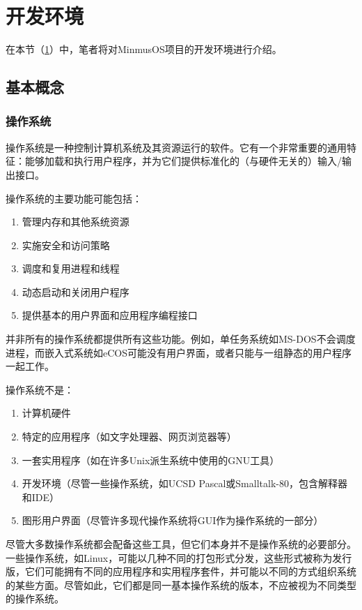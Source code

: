 \section{开发环境}\label{sec:DevelopmentEnvironment}

在本节（\cref{sec:DevelopmentEnvironment}）中，笔者将对MinmusOS项目的开发环境进行介绍。

\subsection{基本概念}

\subsubsection{操作系统}

操作系统是一种控制计算机系统及其资源运行的软件。它有一个非常重要的通用特征：能够加载和执行用户程序，并为它们提供标准化的（与硬件无关的）输入/输出接口。

操作系统的主要功能可能包括：

\begin{enumerate}
    \item 管理内存和其他系统资源
    \item 实施安全和访问策略
    \item 调度和复用进程和线程
    \item 动态启动和关闭用户程序
    \item 提供基本的用户界面和应用程序编程接口
\end{enumerate}

并非所有的操作系统都提供所有这些功能。例如，单任务系统如MS-DOS不会调度进程，而嵌入式系统如eCOS可能没有用户界面，或者只能与一组静态的用户程序一起工作。

操作系统不是：

\begin{enumerate}
    \item 计算机硬件
    \item 特定的应用程序（如文字处理器、网页浏览器等）
    \item 一套实用程序（如在许多Unix派生系统中使用的GNU工具）
    \item 开发环境（尽管一些操作系统，如UCSD Pascal或Smalltalk-80，包含解释器和IDE）
    \item 图形用户界面（尽管许多现代操作系统将GUI作为操作系统的一部分）
\end{enumerate}

尽管大多数操作系统都会配备这些工具，但它们本身并不是操作系统的必要部分。一些操作系统，如Linux，可能以几种不同的打包形式分发，这些形式被称为发行版，它们可能拥有不同的应用程序和实用程序套件，并可能以不同的方式组织系统的某些方面。尽管如此，它们都是同一基本操作系统的版本，不应被视为不同类型的操作系统。

